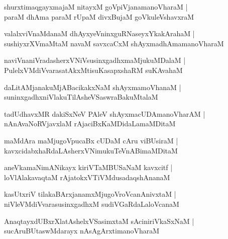 \documentclass[twoside,12pt,openright]{book}
\newcounter{shloka}[chapter]
\begin{document}
\begin{shloka}%
shurxtimaqgayxmajaM nitayxM goVpiVjanamanoVharaM |\\
paraM dhAma paraM rUpaM divxBujaM goVkuleVshavxraM 
\end{shloka}

\begin{shloka}%
valalxviVnaMdanaM dhAyxyeVninxguRNaseyxYkakArahaM |\\
sushiyxrXVmaMtaM navaM savxcaCxM shAyxmadhAmamanoVharaM 
\end{shloka}

\begin{shloka}%
naviVnaniVradasherxVNiVsusinxgadhxmaMjukuMDalaM |\\
PulelxVMdiVvarasatAkxMtisuKasapxshaRM suKAvahaM 
\end{shloka}

\begin{shloka}%
daLitAMjanakuMjABacikakxNaM shAyxmamoVhanaM |\\
suninxgadhxniVlakuTilAsheVSaswraBakuMtalaM 
\end{shloka}

\begin{shloka}%
tadUdhavxMR dakiSxNeV PAleV shAyxmacUDAmanoVharAM |\\
nAnAvaNoRVjavxlaM rAjaciBxKaMDidaLamaMDitaM 
\end{shloka}

\begin{shloka}%
maMdAra maMjugoVpucaBx cUDaM cAru viBUsiraM |\\
kavxcidabxhaRdaLAsherxVNimukuTeVnABimaMDitaM
\end{shloka}

\begin{shloka}%
aneVkamaNimANikayx kiriVTaMBUSaNaM kavxcitf |\\
loVlAlakavaqtaM rAjatokxVTiVMdusadaqshAnanaM 
\end{shloka}

\begin{shloka}%
kasUtxriV tilakaBArxjanamxMjugoVroVcanAnivxtaM |\\
niVleVMdiVvarasusinxgadhxM sudiVGaRdaLaloVcanaM 
\end{shloka}

\begin{shloka}%
AnaqtayxdUBxrXlatAshelxVSasimxtaM sAciniriVkaSxNaM |\\
sucAruBUtaswMdarayx nAsAgArxtimanoVharaM 
\end{shloka}
\end{document}
